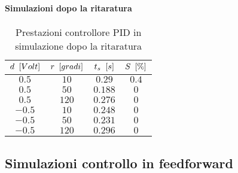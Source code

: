 		\newpage	
		\paragraph{Simulazioni dopo la ritaratura}		
		
			\begin{center}
				 
			\end{center}	
			
			\begin{center}
				 
			\end{center}		
		
			\begin{table}[H]
				\centering
				\begin{tabular}{cccc}
					\toprule
					\textbf{$d \singleSpacing [Volt]$} & \textbf{$r \singleSpacing [gradi]$} & \textbf{$t_s \singleSpacing [s]$} & \textbf{$S \singleSpacing [\%]$}\\
					\midrule
					$0.5$   & $10$  & $0.29$  & $0.4$  \\
					$0.5$   & $50$  & $0.188$ & $0$    \\
					$0.5$   & $120$ & $0.276$ & $0$    \\
					$-0.5$  & $10$  & $0.248$ & $0$    \\
					$-0.5$  & $50$  & $0.231$ & $0$    \\ 	
					$-0.5$  & $120$ & $0.296$ & $0$    \\ 
					\bottomrule
				\end{tabular}
				\caption{Prestazioni controllore PID in simulazione dopo la ritaratura}
				\label{tab:PIDsimRit}
			\end{table}			
			
			
	\subsection{Simulazioni controllo in feedforward}
	\label{subapp:FFsimulazione}	

		\begin{figure}[H]
			\centering
				
		\end{figure}		
		
		\begin{figure}[H]
			\centering
			 	
		\end{figure}	
		
